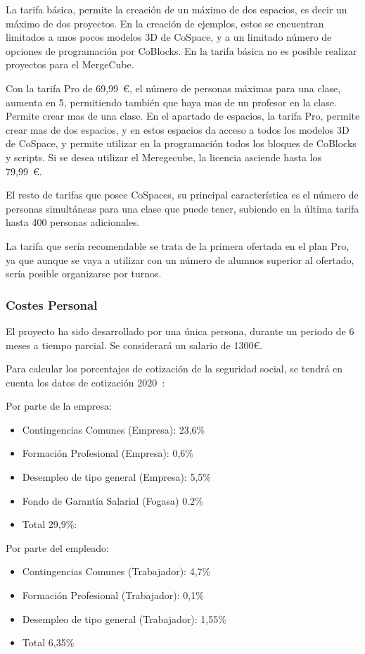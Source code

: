 La tarifa básica, permite la creación de un máximo de dos espacios, es decir un máximo de dos proyectos. En la creación de ejemplos, estos se encuentran limitados a unos pocos modelos 3D de CoSpace, y a un limitado número de opciones de programación por CoBlocks. En la tarifa básica no es posible realizar proyectos para el MergeCube.

Con la tarifa Pro de 69,99~\euro{}, el número de personas máximas para una clase, aumenta en 5, permitiendo también que haya mas de un profesor en la clase. Permite crear mas de una clase. En el apartado de espacios, la tarifa Pro, permite crear mas de dos espacios, y en estos espacios da acceso a todos los modelos 3D de CoSpace, y permite utilizar en la programación todos los bloques de CoBlocks y scripts.
Si se desea utilizar el Meregecube, la licencia asciende hasta los 79,99~\euro{}. 

El resto de tarifas que posee CoSpaces, su principal característica es el número de personas simultáneas para una clase que puede tener, subiendo en la última tarifa hasta 400 personas adicionales.

La tarifa que sería recomendable se trata de la primera ofertada en el plan Pro, ya que aunque se vaya a utilizar con un número de alumnos superior al ofertado, sería posible organizarse por turnos.

\subsubsection{Costes Personal}
El proyecto ha sido desarrollado por una única persona, durante un periodo de 6 meses a tiempo parcial. Se considerará un salario de 1300\euro.

Para calcular los porcentajes de cotización de la seguridad social, se tendrá en cuenta los datos de cotización 2020~\cite{contingencias2020}:

Por parte de la empresa:
\begin{itemize}
	\item Contingencias Comunes (Empresa): 23,6\%
	\item Formación Profesional (Empresa): 0,6\%
	\item Desempleo de tipo general (Empresa): 5,5\%
	\item Fondo de Garantía Salarial (Fogasa) 0.2\%
	\item Total 29,9\%:
\end{itemize}

Por parte del empleado:
\begin{itemize}
	\item Contingencias Comunes (Trabajador): 4,7\%	
	\item Formación Profesional (Trabajador): 0,1\%
	\item Desempleo de tipo general (Trabajador): 1,55\%
	\item Total 6,35\%
\end{itemize}

